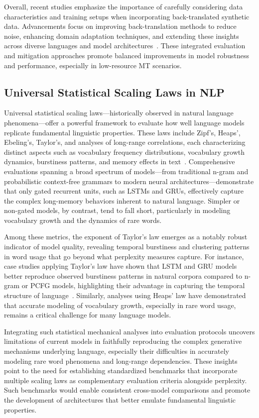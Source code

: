 \documentclass[sigconf]{acmart}
\begin{document}
Overall, recent studies emphasize the importance of carefully considering data characteristics and training setups when incorporating back-translated synthetic data. Advancements focus on improving back-translation methods to reduce noise, enhancing domain adaptation techniques, and extending these insights across diverse languages and model architectures~\cite{ref37}. These integrated evaluation and mitigation approaches promote balanced improvements in model robustness and performance, especially in low-resource MT scenarios.

\subsection{Universal Statistical Scaling Laws in NLP}

Universal statistical scaling laws—historically observed in natural language phenomena—offer a powerful framework to evaluate how well language models replicate fundamental linguistic properties. These laws include Zipf’s, Heaps’, Ebeling’s, Taylor’s, and analyses of long-range correlations, each characterizing distinct aspects such as vocabulary frequency distributions, vocabulary growth dynamics, burstiness patterns, and memory effects in text~\cite{ref51}. Comprehensive evaluations spanning a broad spectrum of models—from traditional n-gram and probabilistic context-free grammars to modern neural architectures—demonstrate that only gated recurrent units, such as LSTMs and GRUs, effectively capture the complex long-memory behaviors inherent to natural language. Simpler or non-gated models, by contrast, tend to fall short, particularly in modeling vocabulary growth and the dynamics of rare words.

Among these metrics, the exponent of Taylor’s law emerges as a notably robust indicator of model quality, revealing temporal burstiness and clustering patterns in word usage that go beyond what perplexity measures capture. For instance, case studies applying Taylor’s law have shown that LSTM and GRU models better reproduce observed burstiness patterns in natural corpora compared to n-gram or PCFG models, highlighting their advantage in capturing the temporal structure of language~\cite{ref51}. Similarly, analyses using Heaps’ law have demonstrated that accurate modeling of vocabulary growth, especially in rare word usage, remains a critical challenge for many language models.

Integrating such statistical mechanical analyses into evaluation protocols uncovers limitations of current models in faithfully reproducing the complex generative mechanisms underlying language, especially their difficulties in accurately modeling rare word phenomena and long-range dependencies. These insights point to the need for establishing standardized benchmarks that incorporate multiple scaling laws as complementary evaluation criteria alongside perplexity. Such benchmarks would enable consistent cross-model comparisons and promote the development of architectures that better emulate fundamental linguistic properties.
\end{document}
